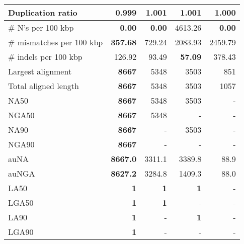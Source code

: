 \documentclass[12pt,a4paper]{article}
\begin{document}
\begin{table}[ht]
\begin{center}
\begin{tabular}{|l*{4}{|r}|}
Duplication ratio & {\bf 0.999} & 1.001 & 1.001 & 1.000 \\ \hline
\# N's per 100 kbp & {\bf 0.00} & {\bf 0.00} & 4613.26 & {\bf 0.00} \\ \hline
\# mismatches per 100 kbp & {\bf 357.68} & 729.24 & 2083.93 & 2459.79 \\ \hline
\# indels per 100 kbp & 126.92 & 93.49 & {\bf 57.09} & 378.43 \\ \hline
Largest alignment & {\bf 8667} & 5348 & 3503 & 851 \\ \hline
Total aligned length & {\bf 8667} & 5348 & 3503 & 1057 \\ \hline
NA50 & {\bf 8667} & 5348 & 3503 & - \\ \hline
NGA50 & {\bf 8667} & 5348 & - & - \\ \hline
NA90 & {\bf 8667} & - & 3503 & - \\ \hline
NGA90 & {\bf 8667} & - & - & - \\ \hline
auNA & {\bf 8667.0} & 3311.1 & 3389.8 & 88.9 \\ \hline
auNGA & {\bf 8627.2} & 3284.8 & 1409.3 & 88.0 \\ \hline
LA50 & {\bf 1} & {\bf 1} & {\bf 1} & - \\ \hline
LGA50 & {\bf 1} & {\bf 1} & - & - \\ \hline
LA90 & {\bf 1} & - & {\bf 1} & - \\ \hline
LGA90 & {\bf 1} & - & - & - \\ \hline
\end{tabular}
\end{center}
\end{table}
\end{document}
